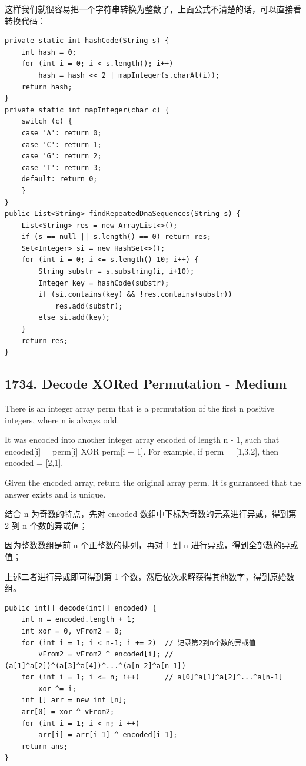 \documentclass[9pt, b5paper]{article}
\begin{document}
这样我们就很容易把一个字符串转换为整数了，上面公式不清楚的话，可以直接看转换代码：

\begin{verbatim}
private static int hashCode(String s) {
    int hash = 0;
    for (int i = 0; i < s.length(); i++) 
        hash = hash << 2 | mapInteger(s.charAt(i));
    return hash;
}
private static int mapInteger(char c) {
    switch (c) {
    case 'A': return 0;
    case 'C': return 1;
    case 'G': return 2;
    case 'T': return 3;
    default: return 0;
    }
}
public List<String> findRepeatedDnaSequences(String s) {
    List<String> res = new ArrayList<>();
    if (s == null || s.length() == 0) return res;
    Set<Integer> si = new HashSet<>();
    for (int i = 0; i <= s.length()-10; i++) {
        String substr = s.substring(i, i+10);
        Integer key = hashCode(substr);
        if (si.contains(key) && !res.contains(substr))
            res.add(substr);
        else si.add(key);
    }
    return res;
}
\end{verbatim}
\subsection{1734. Decode XORed Permutation - Medium}
\label{sec-2-8}
There is an integer array perm that is a permutation of the first n positive integers, where n is always odd.

It was encoded into another integer array encoded of length n - 1, such that encoded[i] = perm[i] XOR perm[i + 1]. For example, if perm = [1,3,2], then encoded = [2,1].

Given the encoded array, return the original array perm. It is guaranteed that the answer exists and is unique.

结合 n 为奇数的特点，先对 encoded 数组中下标为奇数的元素进行异或，得到第 2 到 n 个数的异或值；

因为整数数组是前 n 个正整数的排列，再对 1 到 n 进行异或，得到全部数的异或值；

上述二者进行异或即可得到第 1 个数，然后依次求解获得其他数字，得到原始数组。
\begin{verbatim}
public int[] decode(int[] encoded) {
    int n = encoded.length + 1;
    int xor = 0, vFrom2 = 0;
    for (int i = 1; i < n-1; i += 2)  // 记录第2到n个数的异或值
        vFrom2 = vFrom2 ^ encoded[i]; // (a[1]^a[2])^(a[3]^a[4])^...^(a[n-2]^a[n-1])
    for (int i = 1; i <= n; i++)      // a[0]^a[1]^a[2]^...^a[n-1]
        xor ^= i;
    int [] arr = new int [n];
    arr[0] = xor ^ vFrom2;
    for (int i = 1; i < n; i ++)
        arr[i] = arr[i-1] ^ encoded[i-1];
    return ans;
}
\end{verbatim}
\end{document}
